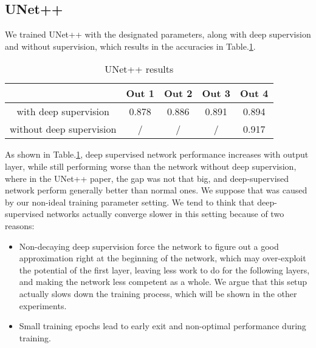 \subsection{UNet++}
We trained UNet++ with the designated parameters, along with deep supervision and without supervision, which results in the accuracies in Table.\ref{tab:unetppResult}.

\begin{table}[!htbp]
\centering
\caption{UNet++ results}\label{tab:unetppResult}
\begin{tabular}{c|c|c|c|c}
\hline
& Out 1&Out 2&Out 3&Out 4\\    
\hline
with deep supervision & 0.878 & 0.886 & 0.891 & 0.894\\
without deep supervision & / & / & / & 0.917\\
\hline
\end{tabular}
\end{table}

As shown in Table.\ref{tab:unetppResult}, deep supervised network performance increases with output layer, while still performing worse than the network without deep supervision, where in the UNet++ paper\cite{unet_pp}, the gap was not that big, and deep-supervised network perform generally better than normal ones. We suppose that was caused by our non-ideal training parameter setting. We tend to think that deep-supervised networks actually converge slower in this setting because of two reasons:
\begin{itemize}
    \item Non-decaying deep supervision force the network to figure out a good approximation right at the beginning of the network, which may over-exploit the potential of the first layer, leaving less work to do for the following layers, and making the network less competent as a whole. We argue that this setup actually slows down the training process, which will be shown in the other experiments.
    \item Small training epochs lead to early exit and non-optimal performance during training.
\end{itemize}
